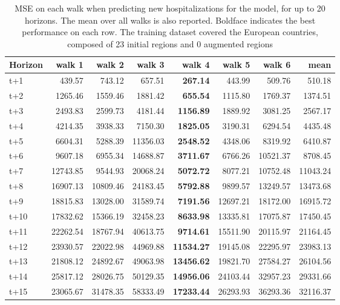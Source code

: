\begin{table}[H]
\centering
\caption{MSE on each walk when predicting new hospitalizations for the model, for up to 20 horizons. The mean over all walks is also reported. Boldface indicates the best performance on each row. The training dataset covered the European countries, composed of 23 initial regions and 0 augmented regions }
\label{tab:MSE_walk_dense_model}
\begin{tabular}{lrrrrrrr}
\toprule
Horizon &   walk 1 &   walk 2 &   walk 3 &   walk 4 &   walk 5 &   walk 6 &     mean \\
\midrule
t+1  & 439.57  & 743.12  & 657.51  & \textbf{267.14}  & 443.99  & 509.76  & 510.18  \\
t+2  & 1265.46  & 1559.46  & 1881.42  & \textbf{655.54}  & 1115.80  & 1769.37  & 1374.51  \\
t+3  & 2493.83  & 2599.73  & 4181.44  & \textbf{1156.89}  & 1889.92  & 3081.25  & 2567.17  \\
t+4  & 4214.35  & 3938.33  & 7150.30  & \textbf{1825.05}  & 3190.31  & 6294.54  & 4435.48  \\
t+5  & 6604.31  & 5288.39  & 11356.03  & \textbf{2548.52}  & 4348.06  & 8319.92  & 6410.87  \\
t+6  & 9607.18  & 6955.34  & 14688.87  & \textbf{3711.67}  & 6766.26  & 10521.37  & 8708.45  \\
t+7  & 12743.85  & 9544.93  & 20068.24  & \textbf{5072.72}  & 8077.21  & 10752.48  & 11043.24  \\
t+8  & 16907.13  & 10809.46  & 24183.45  & \textbf{5792.88}  & 9899.57  & 13249.57  & 13473.68  \\
t+9  & 18815.83  & 13028.00  & 31589.74  & \textbf{7191.56}  & 12697.21  & 18172.00  & 16915.72  \\
t+10  & 17832.62  & 15366.19  & 32458.23  & \textbf{8633.98}  & 13335.81  & 17075.87  & 17450.45  \\
t+11  & 22262.54  & 18767.94  & 40613.75  & \textbf{9714.61}  & 15511.90  & 20115.97  & 21164.45  \\
t+12  & 23930.57  & 22022.98  & 44969.88  & \textbf{11534.27}  & 19145.08  & 22295.97  & 23983.13  \\
t+13  & 21808.12  & 24892.67  & 49063.98  & \textbf{13456.62}  & 19821.70  & 27584.27  & 26104.56  \\
t+14  & 25817.12  & 28026.75  & 50129.35  & \textbf{14956.06}  & 24103.44  & 32957.23  & 29331.66  \\
t+15  & 23065.67  & 31478.35  & 58333.49  & \textbf{17233.44}  & 26293.93  & 36293.36  & 32116.37  \\

\end{tabular}
\end{table}
